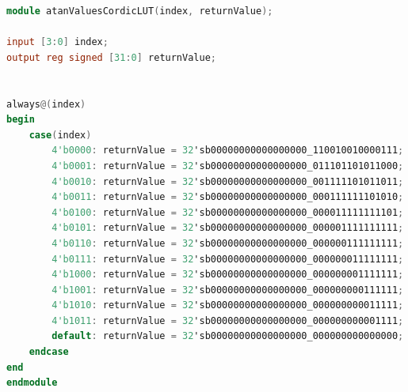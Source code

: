 \documentclass[a4paper, twoside, 11pt]{article}
\newcommand{\fbar}{\FloatBarrier}
\begin{document}
            \fbar
            \begin{lstlisting}[language={verilog}, caption={Verilog code of the atanValuesCordicLUT  lookup table (\gls{abbreviation:lut}) implementation.}, label= {lst:atanValuesCordicLUT}]
module atanValuesCordicLUT(index, returnValue);

input [3:0] index;
output reg signed [31:0] returnValue;


always@(index)
begin
    case(index)
        4'b0000: returnValue = 32'sb00000000000000000_110010010000111; // 0.7853981633974483
        4'b0001: returnValue = 32'sb00000000000000000_011101101011000; // 0.4636476090008061
        4'b0010: returnValue = 32'sb00000000000000000_001111101011011; // 0.24497866312686414
        4'b0011: returnValue = 32'sb00000000000000000_000111111101010; // 0.12435499454676144
        4'b0100: returnValue = 32'sb00000000000000000_000011111111101; // 0.06241880999595735
        4'b0101: returnValue = 32'sb00000000000000000_000001111111111; // 0.031239833430268277
        4'b0110: returnValue = 32'sb00000000000000000_000000111111111; // 0.015623728620476831
        4'b0111: returnValue = 32'sb00000000000000000_000000011111111; // 0.007812341060101111
        4'b1000: returnValue = 32'sb00000000000000000_000000001111111; // 0.007812341060101111
        4'b1001: returnValue = 32'sb00000000000000000_000000000111111; // 0.0019531225164788188
        4'b1010: returnValue = 32'sb00000000000000000_000000000011111; // 0.0009765621895593195
        4'b1011: returnValue = 32'sb00000000000000000_000000000001111; // 0.0004882812111948983
        default: returnValue = 32'sb00000000000000000_000000000000000; // 0
    endcase
end
endmodule\end{lstlisting}
\end{document}
